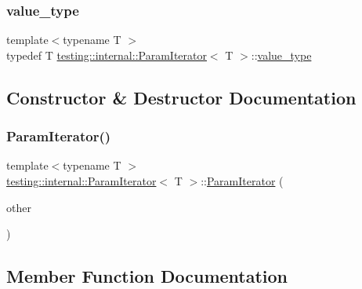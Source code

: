 \subsubsection{\texorpdfstring{value\_type}{value\_type}}
{\footnotesize\ttfamily template$<$typename T $>$ \\
typedef T \mbox{\hyperlink{classtesting_1_1internal_1_1ParamIterator}{testing\+::internal\+::\+Param\+Iterator}}$<$ T $>$\+::\mbox{\hyperlink{classtesting_1_1internal_1_1ParamIterator_a4afe3a68db0d0744753c8afe262e35df}{value\+\_\+type}}}



\subsection{Constructor \& Destructor Documentation}
\mbox{\label{classtesting_1_1internal_1_1ParamIterator_aa10585055ee055e304703a3004f24f33}} 
\subsubsection{\texorpdfstring{ParamIterator()}{ParamIterator()}}
{\footnotesize\ttfamily template$<$typename T $>$ \\
\mbox{\hyperlink{classtesting_1_1internal_1_1ParamIterator}{testing\+::internal\+::\+Param\+Iterator}}$<$ T $>$\+::\mbox{\hyperlink{classtesting_1_1internal_1_1ParamIterator}{Param\+Iterator}} (\begin{DoxyParamCaption}\item[{const \mbox{\hyperlink{classtesting_1_1internal_1_1ParamIterator}{Param\+Iterator}}$<$ T $>$ \&}]{other }\end{DoxyParamCaption})\hspace{0.3cm}{\ttfamily [inline]}}



\subsection{Member Function Documentation}
\mbox{\label{classtesting_1_1internal_1_1ParamIterator_aa024380a4cc0cfdcaa114e942c348fce}} 
